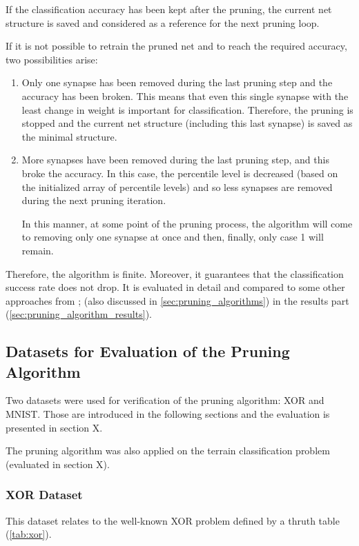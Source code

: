If the classification accuracy has been kept after the pruning, the current net structure is saved and considered as a reference for the next pruning loop.

If it is not possible to retrain the pruned net and to reach the required accuracy, two possibilities arise:

\begin{enumerate}
\item Only one synapse has been removed during the last pruning step and the accuracy has been broken. This means that even this single synapse with the least change in weight is important for classification. Therefore, the pruning is stopped and the current net structure (including this last synapse) is saved as the minimal structure.
\item More synapses have been removed during the last pruning step, and this broke the accuracy. In this case, the percentile level is decreased (based on the initialized array of percentile levels) and so less synapses are removed during the next pruning iteration.

In this manner, at some point of the pruning process, the algorithm will come to removing only one synapse at once and then, finally, only case 1 will remain.
\end{enumerate}

Therefore, the algorithm is finite. Moreover, it guarantees that the classification success rate does not drop. It is evaluated in detail and compared to some other approaches from \citep{article:10:pa}; (also discussed in \cref{sec:pruning_algorithms}) in the results part (\cref{sec:pruning_algorithm_results}).

\subsection{Datasets for Evaluation of the Pruning Algorithm} \label{ssec:testing_datasets}
Two datasets were used for verification of the pruning algorithm: XOR and MNIST. Those are introduced in the following sections and the evaluation is presented in section X.

The pruning algorithm was also applied on the terrain classification problem (evaluated in section X).

\subsubsection*{XOR Dataset}
This dataset relates to the well-known XOR problem defined by a thruth table (\cref{tab:xor}).

